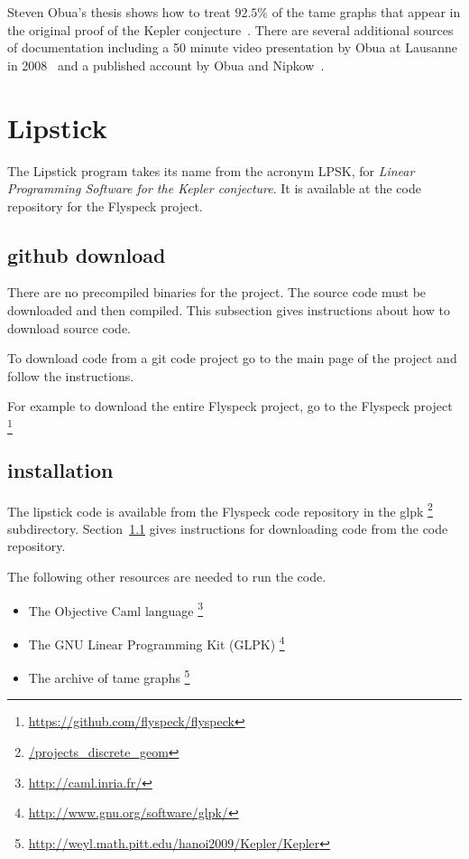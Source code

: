 Steven Obua's thesis shows how to treat $92.5\%$ of the tame graphs
that appear in the original proof of the Kepler conjecture~\cite{obua:phd}.  There are
several additional sources of documentation including a 50 minute video
presentation by Obua at Lausanne in 2008~\cite{obua:2008:video} and a
published account by Obua and Nipkow~\cite{obua-nipkow:2009}.

\section{Lipstick}

The Lipstick program takes its name from the acronym LPSK, for
{\it Linear Programming Software for the Kepler conjecture}.  It is available
at the code repository for the Flyspeck project.


\subsection{github download}\label{sec:code}

There are no precompiled binaries for the project.  The source code
must be downloaded and then compiled.  This subsection gives
instructions about how to download source code.

To download code from a git code project go to the main page of the
project and follow the instructions.

For example to download the entire Flyspeck project, go to
the Flyspeck project%
\footnote{\url{https://github.com/flyspeck/flyspeck}} %


\subsection{installation}

The lipstick code is available from the Flyspeck  code repository in
the glpk%
\footnote{\url{/projects_discrete_geom}} %
 subdirectory.  Section~\ref{sec:code}
gives instructions for downloading code from the  code repository.

The following other resources are needed to run the code.

\begin{itemize}
\item The Objective Caml language%
\footnote{\url{http://caml.inria.fr/}} %
\item The GNU Linear Programming Kit (GLPK)%
\footnote{\url{http://www.gnu.org/software/glpk/}} %
\item The archive of tame graphs%
\footnote{\url{http://weyl.math.pitt.edu/hanoi2009/Kepler/Kepler}}
\end{itemize}

